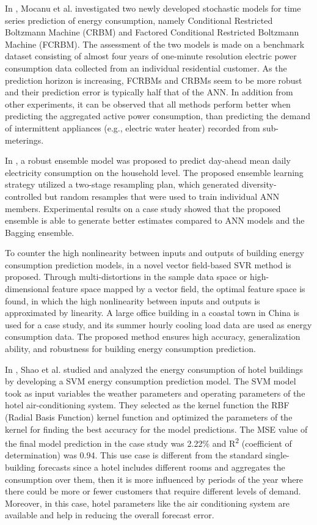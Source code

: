 In \cite{MOCANU201691}, Mocanu et al. investigated two newly developed stochastic models for time series prediction of energy consumption, namely Conditional Restricted Boltzmann Machine (CRBM) and Factored Conditional Restricted Boltzmann Machine (FCRBM).
The assessment of the two models is made on a benchmark dataset consisting of almost four years of one-minute resolution electric power consumption data collected from an individual residential customer.
As the prediction horizon is increasing, FCRBMs and CRBMs seem to be more robust and their prediction error is typically half that of the ANN.
In addition from other experiments, it can be observed that all methods perform better when predicting the aggregated active power consumption, than predicting the demand of intermittent appliances (e.g., electric water heater) recorded from sub-meterings.

In \cite{ALOBAIDI2018997}, a robust ensemble model was proposed to predict day-ahead mean daily electricity consumption on the household level.
The proposed ensemble learning strategy utilized a two-stage resampling plan, which generated diversity-controlled but random resamples that were used to train individual ANN members.
Experimental results on a case study showed that the proposed ensemble is able to generate better estimates compared to ANN models and the Bagging ensemble.

To counter the high nonlinearity between inputs and outputs of building energy consumption prediction models, in \cite{ZHONG2019403} a novel vector field-based SVR method is proposed.
Through multi-distortions in the sample data space or high-dimensional feature space mapped by a vector field, the optimal feature space is found, in which the high nonlinearity between inputs and outputs is approximated by linearity.
A large office building in a coastal town in China is used for a case study, and its summer hourly cooling load data are used as energy consumption data.
The proposed method ensures high accuracy, generalization ability, and robustness for building energy consumption prediction.

In \cite{SHAO2020102128}, Shao et al. studied and analyzed the energy consumption of hotel buildings by developing a SVM energy consumption prediction model.
The SVM model took as input variables the weather parameters and operating parameters of the hotel air-conditioning system.
They selected as the kernel function the RBF (Radial Basis Function) kernel function and optimized the parameters of the kernel for finding the best accuracy for the model predictions.
The MSE value of the final model prediction in the case study was 2.22\% and R\textsuperscript{2} (coefficient of determination) was 0.94.
This use case is different from the standard single-building forecasts since a hotel includes different rooms and aggregates the consumption over them, then it is more influenced by periods of the year where there could be more or fewer customers that require different levels of demand.
Moreover, in this case, hotel parameters like the air conditioning system are available and help in reducing the overall forecast error.

